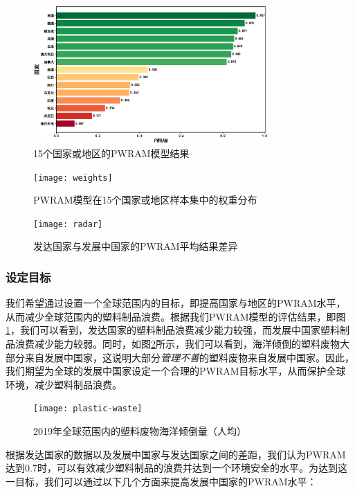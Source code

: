 \documentclass[UTF8, fontset=windows]{mcmthesis}
\begin{document}
\begin{figure}[h]
\centering
\includegraphics[width=0.8\textwidth]{figures/pwram.eps}
\caption{15个国家或地区的PWRAM模型结果}
\label{fig:pwram}
\end{figure}

\begin{figure}[h]
  \centering
  \texttt{[image: weights]}
  \caption{PWRAM模型在15个国家或地区样本集中的权重分布}
\end{figure}

\begin{figure}[h]
  \centering
  \texttt{[image: radar]}
  \caption{发达国家与发展中国家的PWRAM平均结果差异}
\end{figure}

\subsubsection{设定目标}

我们希望通过设置一个全球范围内的目标，即提高国家与地区的PWRAM水平，从而减少全球范围内的塑料制品浪费。根据我们PWRAM模型的评估结果，即图\ref{fig:pwram}，我们可以看到，发达国家的塑料制品浪费减少能力较强，而发展中国家塑料制品浪费减少能力较弱。同时，如图\ref{fig:plastic-waste}所示\cite{owid-plastic-pollution}，我们可以看到，海洋倾倒的塑料废物大部分来自发展中国家，这说明大部分\textit{管理不善}的塑料废物来自发展中国家。因此，我们期望为全球的发展中国家设定一个合理的PWRAM目标水平，从而保护全球环境，减少塑料制品浪费。

\begin{figure}[h]
\centering
\texttt{[image: plastic-waste]}
\caption{2019年全球范围内的塑料废物海洋倾倒量（人均）}
\label{fig:plastic-waste}
\end{figure}

根据发达国家的数据以及发展中国家与发达国家之间的差距，我们认为PWRAM达到0.7时，可以有效减少塑料制品的浪费并达到一个环境安全的水平。为达到这一目标，我们可以通过以下几个方面来提高发展中国家的PWRAM水平：
\end{document}
